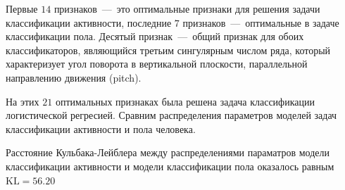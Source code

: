 \documentclass[12pt, twoside]{article}
\begin{document}
Первые $14$ признаков~---~это оптимальные признаки для решения задачи классификации активности, последние $7$ признаков~---~оптимальные в задаче классификации пола. Десятый признак~---~общий признак для обоих классификаторов, являющийся третьим сингулярным числом ряда, который характеризует угол поворота в вертикальной плоскости, параллельной направлению движения (pitch).


На этих $21$ оптимальных признаках была решена задача классификации логистической регресией. Сравним распределения параметров моделей задач классификации активности и пола человека.

\begin{table}[H]
\caption{Средние и дисперсии векторов параметров моделей классифкации активности и пола}
\begin{table}[]
\centering
{}
\end{table}

\end{table}

Расстояние Кульбака-Лейблера между распределениями параматров модели классификации активности и модели классификации пола оказалось равным $\text{KL}=56.20$
\end{document}

